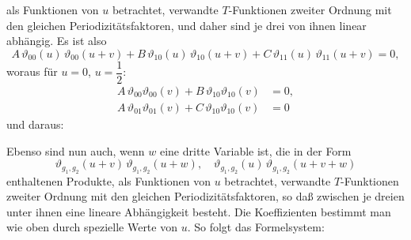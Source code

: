 als Funktionen von $u$ betrachtet, verwandte $T$-Funktionen zweiter Ordnung mit den gleichen Periodizitätsfaktoren, und daher sind je drei von ihnen linear abhängig. Es ist also
\[
A\,\vartheta_{00}(u)\,\vartheta_{00}(u+v) + B\,\vartheta_{10}(u)\,\vartheta_{10}(u+v) + C\,\vartheta_{11}(u)\,\vartheta_{11}(u+v) = 0,
\]
woraus für $u=0$, $u=\dfrac{1}{2}$:
\[
\begin{aligned}
A\,\vartheta_{00}\vartheta_{00}(v) + B\,\vartheta_{10}\vartheta_{10}(v) &= 0,\\
A\,\vartheta_{01}\vartheta_{01}(v) + C\,\vartheta_{10}\vartheta_{10}(v) &= 0
\end{aligned}
\]
und daraus:


Ebenso sind nun auch, wenn $w$ eine dritte Variable ist, die in der Form
\[
\vartheta_{g_1,g_2}(u+v)\,\vartheta_{g_1,g_2}(u+w), \quad \vartheta_{g_1,g_2}(u)\,\vartheta_{g_1,g_2}(u+v+w)
\]
enthaltenen Produkte, als Funktionen von $u$ betrachtet, verwandte $T$-Funktionen zweiter Ordnung mit den gleichen Periodizitätsfaktoren, so daß zwischen je dreien unter ihnen eine lineare Abhängigkeit besteht. Die Koeffizienten bestimmt man wie oben durch spezielle Werte von $u$. So folgt das Formelsystem:


